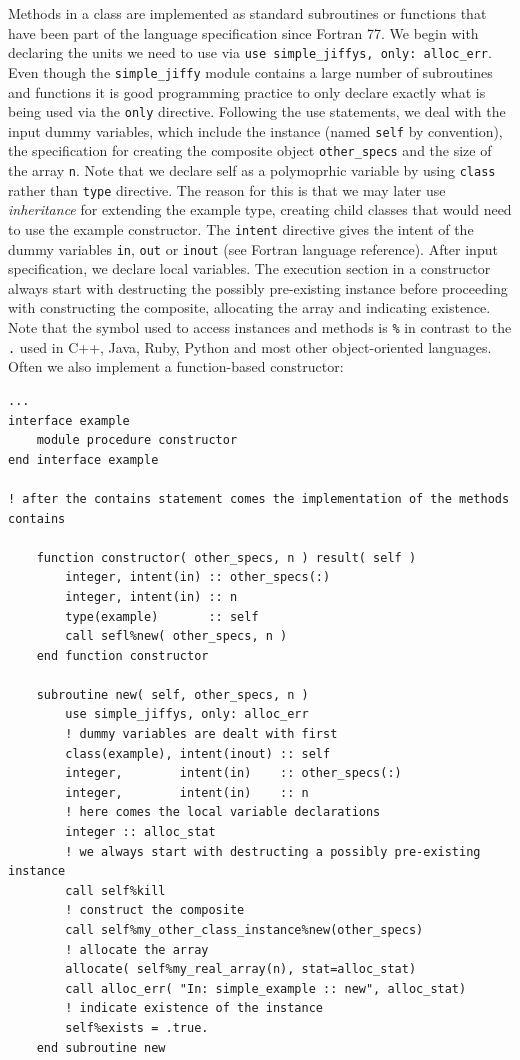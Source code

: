 \documentclass[a4paper,11pt]{article}
\begin{document}
Methods in a class are implemented as standard subroutines or functions that have been part of the language specification since Fortran 77. We begin with declaring the units we need to use via \texttt{use simple\_jiffys, only: alloc\_err}. Even though the \texttt{simple\_jiffy} module contains a large number of subroutines and functions it is good programming practice to only declare exactly what is being used via the \texttt{only} directive. Following the use statements, we deal with the input dummy variables, which include the instance (named \texttt{self} by convention), the specification for creating the composite object \texttt{other\_specs} and the size of the array \texttt{n}. Note that we declare self as a polymoprhic variable by using \texttt{class} rather than \texttt{type} directive. The reason for this is that we may later use \textit{inheritance} for extending the example type, creating child classes that would need to use the example constructor.  The \texttt{intent} directive gives the intent of the dummy variables \texttt{in}, \texttt{out} or \texttt{inout} (see Fortran language reference). After input specification, we declare local variables. The execution section in a constructor always start with destructing the possibly pre-existing instance before proceeding with constructing the composite, allocating the array and indicating existence. Note that the symbol used to access instances and methods is \texttt{\%} in contrast to the \texttt{.} used in C++, Java, Ruby, Python and most other object-oriented languages. Often we also implement a function-based constructor:
\begin{verbatim}
...
interface example
    module procedure constructor
end interface example

! after the contains statement comes the implementation of the methods
contains

    function constructor( other_specs, n ) result( self )
        integer, intent(in) :: other_specs(:)
        integer, intent(in) :: n
        type(example)       :: self
        call sefl%new( other_specs, n )
    end function constructor

    subroutine new( self, other_specs, n )
        use simple_jiffys, only: alloc_err
        ! dummy variables are dealt with first
        class(example), intent(inout) :: self
        integer,        intent(in)    :: other_specs(:)
        integer,        intent(in)    :: n
        ! here comes the local variable declarations
        integer :: alloc_stat
        ! we always start with destructing a possibly pre-existing instance
        call self%kill
        ! construct the composite
        call self%my_other_class_instance%new(other_specs)
        ! allocate the array
        allocate( self%my_real_array(n), stat=alloc_stat)
        call alloc_err( "In: simple_example :: new", alloc_stat)
        ! indicate existence of the instance
        self%exists = .true.
    end subroutine new
\end{verbatim}
\end{document}

